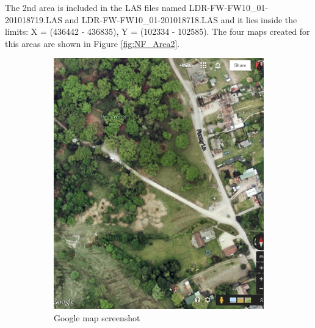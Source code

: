 \documentclass{subfiles}
\begin{document}
	   
	   
	   \newpage
	   \par The 2nd area is included in the LAS files named LDR-FW-FW10\_01-201018719.LAS and LDR-FW-FW10\_01-201018718.LAS and it lies inside the limits:  X = (436442 - 436835), Y = (102334 - 102585). The four maps created for this areas are shown in Figure \ref{fig:NF_Area2}.
	   
	   \begin{figure} [h!]
	   	\begin{subfigure}[t]{.5\textwidth}
	   		\centering
	   		\includegraphics[width=.9\textwidth]{img/NewForest/Area2GoogleMap}
	   		\caption{Google map screenshot}
	   		\label{fig:Area2GoogleMap}
	   	\end{subfigure} \hfill
	   	\begin{subfigure}[t]{.5\textwidth}
	   		\centering

\end{subfigure}
\end{figure}
\end{document}
